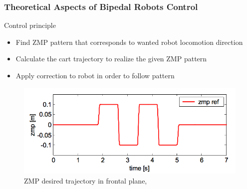 \documentclass{beamer}
\begin{document}
	\begin{frame}
		\frametitle{Theoretical Aspects of Bipedal Robots Control}
		\begin{block}{Control principle}
			\begin{itemize}
				\item
				Find ZMP pattern that corresponds to wanted robot locomotion direction
				\item
				Calculate the cart trajectory to realize the given ZMP pattern
				\item
				Apply correction to robot in order to follow pattern
			\end{itemize}
		\end{block}
		
		\begin{figure}[h!]
			\begin{minipage}[H]{\linewidth}
				\centering
				\includegraphics[width=0.85\linewidth]{presentation_images/13}
				\caption{ZMP desired trajectory in frontal plane, \cite{kajita2003biped}}
			\end{minipage}
		\end{figure}
	\end{frame}
	
\end{document}
